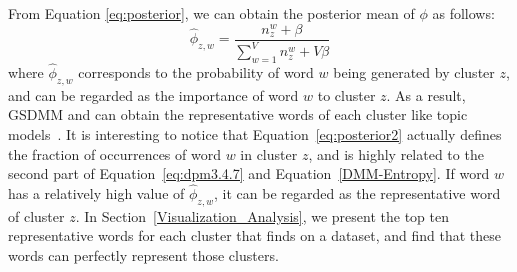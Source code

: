 From Equation \ref{eq:posterior}, we can obtain the posterior mean of $\phi$ as follows:
\begin{equation}\label{eq:posterior2}
    \hat{\phi}_{z,w} = \frac{n_z^{w} + \beta}{\sum_{w=1}^V n_z^{w} +V\beta}
\end{equation}
where $\hat{\phi}_{z,w}$ corresponds to the probability of word $w$ being generated by cluster $z$, and can be regarded as the importance of word $w$ to cluster $z$.
As a result, GSDMM and \sysname{} can obtain the representative words of each cluster like topic models~\cite{Blei:LDA2003}. It is interesting to notice that Equation~\eqref{eq:posterior2} actually defines the fraction of occurrences of word $w$ in cluster $z$, and is highly related to the second part of Equation~\eqref{eq:dpm3.4.7} and Equation~\eqref{DMM-Entropy}. If word $w$ has a relatively high value of $\hat{\phi}_{z,w}$, it can be regarded as the representative word of cluster $z$. In Section~\ref{Visualization_Analysis}, we present the top ten representative words for each cluster that \sysname{} finds on a dataset, and find that these words can perfectly represent those clusters.


